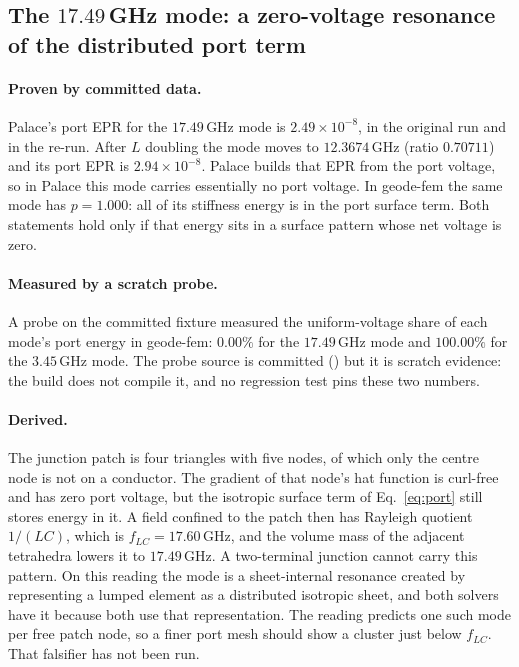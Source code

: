 \documentclass{anvil-paper}
\begin{document}
\subsection{The \texorpdfstring{$17.49$\,GHz}{17.49 GHz} mode: a zero-voltage resonance of the distributed port term}
\label{sec:port-artifact}

\paragraph{Proven by committed data.}
Palace's port EPR for the $17.49$\,GHz mode is $2.49\times10^{-8}$, in
the original run and in the re-run. After $L$ doubling the mode moves to
$12.3674$\,GHz (ratio $0.70711$) and its port EPR is
$2.94\times10^{-8}$. Palace builds that EPR from the port voltage, so in
Palace this mode carries essentially no port voltage. In geode-fem the
same mode has $p = 1.000$: all of its stiffness energy is in the port
surface term. Both statements hold only if that energy sits in a
surface pattern whose net voltage is zero.

\paragraph{Measured by a scratch probe.}
A probe on the committed fixture measured the uniform-voltage share of
each mode's port energy in geode-fem: $0.00\%$ for the $17.49$\,GHz mode
and $100.00\%$ for the $3.45$\,GHz mode. The probe source is committed
()
but it is scratch evidence: the build does not compile it, and no
regression test pins these two numbers.

\paragraph{Derived.}
The junction patch is four triangles with five nodes, of which only the
centre node is not on a conductor. The gradient of that node's hat
function is curl-free and has zero port voltage, but the isotropic
surface term of Eq.~\ref{eq:port} still stores energy in it. A field
confined to the patch then has Rayleigh quotient $1/(LC)$, which is
$f_{LC} = 17.60$\,GHz, and the volume mass of the adjacent tetrahedra
lowers it to $17.49$\,GHz. A two-terminal junction cannot carry this
pattern. On this reading the mode is a sheet-internal resonance created
by representing a lumped element as a distributed isotropic sheet, and
both solvers have it because both use that representation. The reading
predicts one such mode per free patch node, so a finer port mesh should
show a cluster just below $f_{LC}$. That falsifier has not been run.
\end{document}
